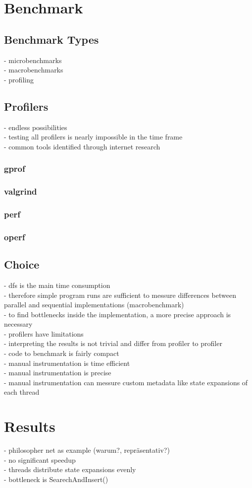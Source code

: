 \section{Benchmark}
\subsection{Benchmark Types}
- microbenchmarks\\
- macrobenchmarks\\
- profiling\\
\subsection{Profilers}
- endless possibilities \\
- testing all profilers is nearly impossible in the time frame\\
- common tools identified through internet research\\
\subsubsection{gprof}
\subsubsection{valgrind}
\subsubsection{perf}
\subsubsection{operf}
\subsection{Choice}
- dfs is the main time consumption\\
- therefore simple program runs are sufficient to messure differences between parallel and sequential implementations (macrobenchmark)\\
- to find bottlenecks inside the implementation, a more precise approach is necessary\\
- profilers have limitations\\
- interpreting the results is not trivial and differ from profiler to profiler\\
- code to benchmark is fairly compact\\
- manual instrumentation is time efficient\\
- manual instrumentation is precise\\
- manual instrumentation can messure custom metadata like state expansions of each thread\\

\section{Results}
- philosopher net as example (warum?, repräsentativ?)\\
- no significant speedup\\
- threads distribute state expansions evenly\\
- bottleneck is SearechAndInsert()\\